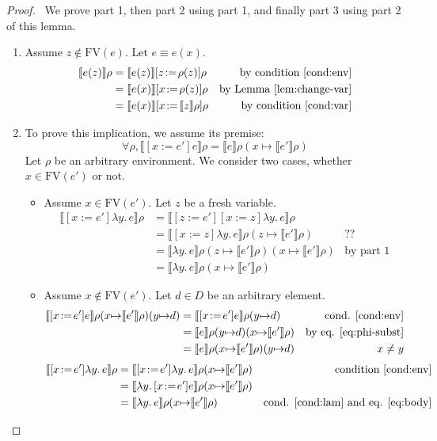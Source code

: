 \documentclass{tufte-handout}
\newcommand{\SEM}[1]{\llbracket #1 \rrbracket}
\newcommand{\LAM}[1]{\lambda #1.\,}
\newcommand{\by}[0]{\!:=\!}
\newcommand{\ext}[3]{#3(#1{\mapsto}#2)}
\begin{document}
\begin{proof}\
  We prove part 1, then part 2 using part 1, and finally part 3 using
  part 2 of this lemma.
\begin{enumerate}
\item Assume $z \notin \mathrm{FV}(e)$. Let $e \equiv e(x)$.
  \begin{align*}
    \SEM{ e(z) } \rho &= \SEM{e(z)}[z\by \rho(z)]\rho & \text{by condition \ref{cond:env}}\\
       &= \SEM{e(x)}[x\by \rho(z)]\rho & \text{by Lemma~\ref{lem:change-var}}\\
       &= \SEM{e(x)}[x\by \SEM{z}\rho]\rho  & \text{by condition \ref{cond:var}}
  \end{align*}
\item 
  To prove this implication, we assume its premise:
  \begin{equation}
    \forall \rho, \SEM{ [x\by e']e} \rho = \SEM{e}\ext{x}{\SEM{e'}\rho}{\rho} \label{eq:phi-subst}
  \end{equation}
  Let $\rho$ be an arbitrary environment.
  We consider two cases, whether $x \in \mathrm{FV}(e')$ or not.
  \begin{itemize}
  \item Assume $x \in \mathrm{FV}(e')$. Let $z$ be a fresh variable.
    \begin{align*}
      \SEM{[x\by e']\LAM{y}e}\rho &= \SEM{ [z\by e'][x\by z]\LAM{y}e }\rho\\
             &= \SEM{[x\by z]\LAM{y}e} \ext{z}{\SEM{e'}\rho}{\rho} & \text{??} \\
             &= \SEM{\LAM{y}e}\ext{x}{\SEM{e'}\rho}{\ext{z}{\SEM{e'}\rho}{\rho}}& \text{by part 1}\\
             &= \SEM{\LAM{y}e}\ext{x}{\SEM{e'}\rho}{\rho}
    \end{align*}

  \item Assume $x \notin \mathrm{FV}(e')$.
    Let $d \in D$ be an arbitrary element.
    \begin{align}
           \SEM{[x\by e']e}\ext{y}{d}{\ext{x}{\SEM{e'}\rho}{\rho}} \notag
        &= \SEM{[x\by e']e}\ext{y}{d}{\rho} & \text{cond. \ref{cond:env}}\notag\\
        &= \SEM{e}\ext{x}{\SEM{e'}\rho}{\ext{y}{d}{\rho}} & \text{by eq. \eqref{eq:phi-subst}} \notag\\
        &= \SEM{e}\ext{y}{d}{\ext{x}{\SEM{e'}\rho}{\rho}} & x\neq y \label{eq:body}
    \end{align}
    \begin{align*}
      \SEM{ [x\by e']\LAM{y}e} \rho
      &= \SEM{ [x\by e']\LAM{y}e} \ext{x}{\SEM{e'}\rho}{\rho}
         & \text{condition \ref{cond:env}} \\
      &= \SEM{ \LAM{y}[x\by e'] e} \ext{x}{\SEM{e'}\rho}{\rho} \\
      &= \SEM{\LAM{y}e}\ext{x}{\SEM{e'}\rho}{\rho}
          & \text{cond. \ref{cond:lam} and eq. \eqref{eq:body}}
    \end{align*}
    

\end{itemize}
\end{enumerate}
\end{proof}
\end{document}
